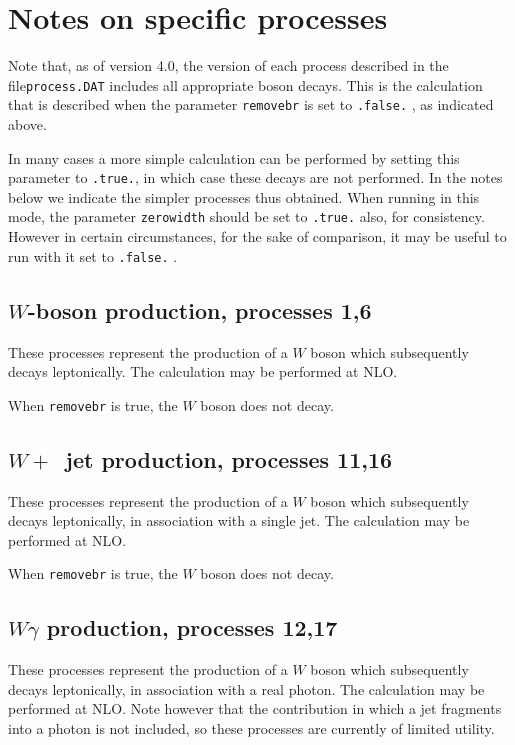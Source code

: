 \documentclass[12pt]{article}
\begin{document}
\section{Notes on specific processes}
\label{sec:specific}

Note that, as of version 4.0, the version of each process described in the file{\tt process.DAT} includes all appropriate boson decays. This is the 
calculation
that is described when the parameter {\tt removebr} is set to {\tt .false.} ,
as indicated above.

In many cases a more simple calculation can be performed by setting this
parameter to {\tt .true.}, in which case these decays are not performed. In the
notes below we indicate the simpler processes thus obtained. When running in
this mode, the parameter {\tt zerowidth} should be set to {\tt .true.} also,
for consistency. However in certain circumstances, for the sake of comparison,
it may be useful to run with it set to {\tt .false.} .

\subsection{$W$-boson production, processes 1,6}
\label{subsec:wboson}

These processes represent the production of a $W$ boson which subsequently
decays leptonically. The calculation may be performed at NLO.

When {\tt removebr} is true, the $W$ boson does not decay.

\subsection{$W+$~jet production, processes 11,16}
\label{subsec:w1jet}

These processes represent the production of a $W$ boson which subsequently
decays leptonically, in association with a single jet.
The calculation may be performed at NLO.

When {\tt removebr} is true, the $W$ boson does not decay.

\subsection{$W\gamma$ production, processes 12,17}
\label{subsec:wgamma}

These processes represent the production of a $W$ boson which subsequently
decays leptonically, in association with a real photon.
The calculation may be performed at NLO. Note however that the contribution
in which a jet fragments into a photon is not included, so these processes 
are currently of limited utility.
\end{document}
